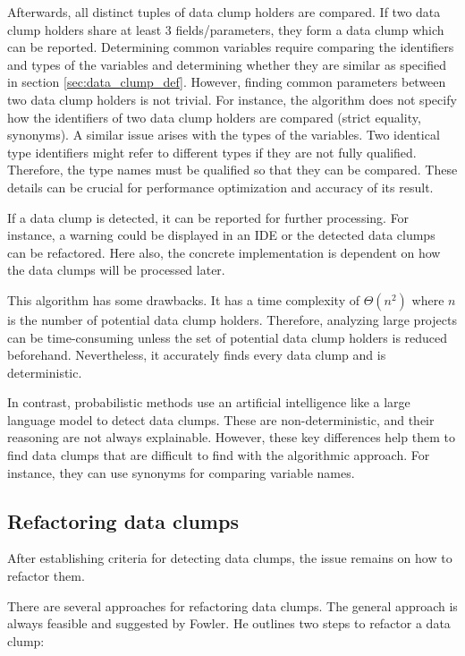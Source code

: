 Afterwards, all distinct tuples of data clump holders are compared. If two data clump holders share at least 3 fields/parameters, they form a data clump which can be reported. Determining common variables require comparing the identifiers and types of the variables and determining whether they are similar as specified in section \ref{sec:data_clump_def}. However, finding common parameters between two data clump holders is not trivial.  For instance, the algorithm does not specify how the identifiers of two data clump holders are compared (strict equality, synonyms). A similar issue arises with the types of the variables.  Two identical type identifiers might refer to different types if they are not fully qualified. Therefore, the type names must be qualified so that they can be compared. These details can be crucial for performance optimization and accuracy of its result. 



If a data clump is detected, it can be reported for further processing. For instance, a warning could be displayed in an \ac{IDE} or the detected data clumps can be refactored. Here also, the concrete implementation is dependent on how the data clumps will be processed later.

This algorithm has some drawbacks. It has a time complexity of $\Theta(n^2)$ where $n$ is the number of potential data clump holders. Therefore, analyzing  large projects can be time-consuming unless the set of potential data clump holders is reduced beforehand. Nevertheless, it accurately finds every data clump and is deterministic.

In contrast, probabilistic methods use an artificial intelligence like a large language model to detect data clumps. These are non-deterministic, and their reasoning are not always explainable. However,  these key differences help them to find data clumps that are difficult to find with the algorithmic approach. For instance, they can use synonyms for comparing variable names. 
  
\subsection{Refactoring data clumps}\label{sec:data_clump_refactor}

After establishing criteria for detecting data clumps, the issue remains on how to refactor them.

There are several approaches for refactoring data clumps. The general approach is always feasible and suggested by Fowler.
He outlines two  steps to refactor a data clump:

